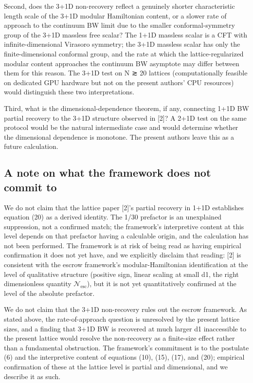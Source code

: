 \documentclass[11pt]{article}
\begin{document}
Second, does the 3+1D non-recovery reflect a genuinely shorter
characteristic length scale of the 3+1D modular Hamiltonian content, or
a slower rate of approach to the continuum BW limit due to the smaller
conformal-symmetry group of the 3+1D massless free scalar? The 1+1D
massless scalar is a CFT with infinite-dimensional Virasoro symmetry;
the 3+1D massless scalar has only the finite-dimensional conformal
group, and the rate at which the lattice-regularized modular content
approaches the continuum BW asymptote may differ between them for this
reason. The 3+1D test on N ≳ 20 lattices (computationally feasible on
dedicated GPU hardware but not on the present authors' CPU resources)
would distinguish these two interpretations.

Third, what is the dimensional-dependence theorem, if any, connecting
1+1D BW partial recovery to the 3+1D structure observed in [2]? A 2+1D
test on the same protocol would be the natural intermediate case and
would determine whether the dimensional dependence is monotone. The
present authors leave this as a future calculation.


\subsection{A note on what the framework does not commit to}

We do not claim that the lattice paper [2]'s partial recovery in 1+1D
establishes equation (20) as a derived identity. The 1/30 prefactor is
an unexplained suppression, not a confirmed match; the framework's
interpretive content at this level depends on that prefactor having a
calculable origin, and the calculation has not been performed. The
framework is at risk of being read as having empirical confirmation it
does not yet have, and we explicitly disclaim that reading: [2] is
consistent with the escrow framework's modular-Hamiltonian
identification at the level of qualitative structure (positive sign,
linear scaling at small d1, the right dimensionless quantity $\mathcal{N}_{\mathrm{esc}}$), but
it is not yet quantitatively confirmed at the level of the absolute
prefactor.

We do not claim that the 3+1D non-recovery rules out the escrow
framework. As stated above, the rate-of-approach question is unresolved
by the present lattice sizes, and a finding that 3+1D BW is recovered at
much larger d1 inaccessible to the present lattice would resolve the
non-recovery as a finite-size effect rather than a fundamental
obstruction. The framework's commitment is to the postulate (6) and the
interpretive content of equations (10), (15), (17), and (20); empirical
confirmation of these at the lattice level is partial and dimensional,
and we describe it as such.
\end{document}

